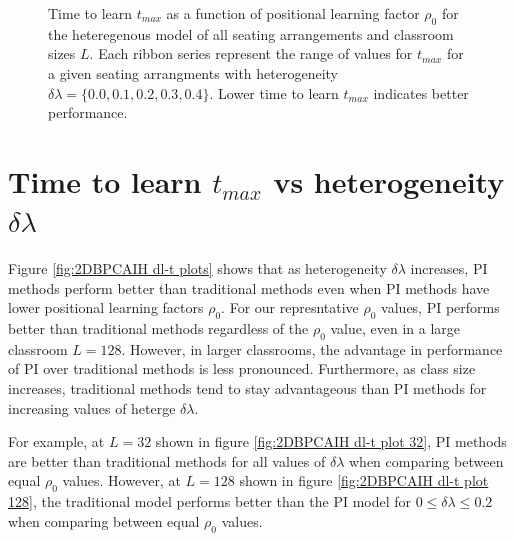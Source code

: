\begin{figure}[htbp!]
   \caption{Time to learn $t_{max}$ as a function of positional learning factor $\rho_0$ for the heteregenous model of all seating arrangements and classroom sizes $L$. 
   Each ribbon series represent the range of values for $t_{max}$ for a given seating arrangments with heterogeneity $\delta\lambda = \lbrace 0.0, 0.1, 0.2, 0.3, 0.4 \rbrace$.
   Lower time to learn $t_{max}$ indicates better performance.
   }
   \label{fig:2DBPCAIH t-rho ribbon plot}
\end{figure}

\newpage %

\section{Time to learn $t_{max}$ vs heterogeneity $\delta\lambda$}\label{sec:BPCAIH t vs dl}

Figure \ref{fig:2DBPCAIH dl-t plots} shows that as heterogeneity $\delta\lambda$ increases, PI methods perform better than traditional methods even when PI methods have lower positional learning factors $\rho_0$. For our represntative $\rho_0$ values, PI performs better than traditional methods regardless of the $\rho_0$ value, even in a large classroom $L=128$. 
However, in larger classrooms, the advantage in performance of PI over traditional methods is less pronounced. 
Furthermore, as class size increases, traditional methods tend to stay advantageous than PI methods for increasing values of heterge $\delta\lambda$.

For example, at $L=32$ shown in figure \ref{fig:2DBPCAIH dl-t plot 32}, PI methods are better than traditional methods for all values of $\delta\lambda$ when comparing between equal $\rho_0$ values. 
However, at $L=128$ shown in figure \ref{fig:2DBPCAIH dl-t plot 128}, the traditional model performs better than the PI model for $0 \leq \delta\lambda \leq 0.2$ when comparing between equal $\rho_0$ values.

